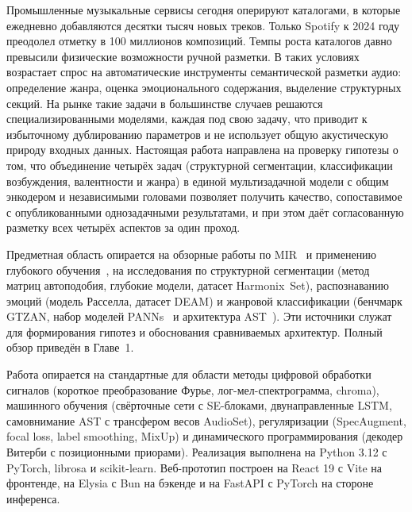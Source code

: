 
\introduction

\actuality

Промышленные музыкальные сервисы сегодня оперируют каталогами, в которые ежедневно добавляются десятки тысяч новых треков. Только Spotify к 2024 году преодолел отметку в 100 миллионов композиций. Темпы роста каталогов давно превысили физические возможности ручной разметки. В таких условиях возрастает спрос на автоматические инструменты семантической разметки аудио: определение жанра, оценка эмоционального содержания, выделение структурных секций. На рынке такие задачи в большинстве случаев решаются специализированными моделями, каждая под свою задачу, что приводит к избыточному дублированию параметров и не использует общую акустическую природу входных данных. Настоящая работа направлена на проверку гипотезы о том, что объединение четырёх задач (структурной сегментации, классификации возбуждения, валентности и жанра) в единой мультизадачной модели с общим энкодером и независимыми головами позволяет получить качество, сопоставимое с опубликованными однозадачными результатами, и при этом даёт согласованную разметку всех четырёх аспектов за один проход.

\review

Предметная область опирается на обзорные работы по MIR~\cite{downie2003mir} и применению глубокого обучения~\cite{choi2017tutorial}, на исследования по структурной сегментации (метод матриц автоподобия, глубокие модели, датасет Harmonix~Set), распознаванию эмоций (модель Расселла, датасет DEAM) и жанровой классификации (бенчмарк GTZAN, набор моделей PANNs~\cite{kong2020panns} и архитектура AST~\cite{gong2021ast}). Эти источники служат для формирования гипотез и обоснования сравниваемых архитектур. Полный обзор приведён в Главе~1.

\goalandtasks

\tools

Работа опирается на стандартные для области методы цифровой обработки сигналов (короткое преобразование Фурье, лог-мел-спектрограмма, chroma), машинного обучения (свёрточные сети с SE-блоками, двунаправленные LSTM, самовнимание AST с трансфером весов AudioSet), регуляризации (SpecAugment, focal loss, label smoothing, MixUp) и динамического программирования (декодер Витерби с позиционными приорами). Реализация выполнена на Python 3.12 с PyTorch, librosa и scikit-learn. Веб-прототип построен на React 19 с Vite на фронтенде, на Elysia с Bun на бэкенде и на FastAPI с PyTorch на стороне инференса.

